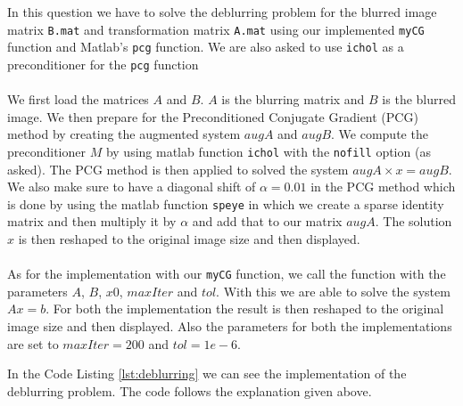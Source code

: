 \documentclass[unicode,11pt,a4paper,oneside,numbers=endperiod,openany]{scrartcl}
\begin{document}
In this question we have to solve the deblurring problem for the blurred image matrix \texttt{B.mat} and transformation matrix \texttt{A.mat} using our implemented \texttt{myCG} function and Matlab's \texttt{pcg} function. We are also asked to use \texttt{ichol} as a preconditioner for the \texttt{pcg} function
\\
\\
We first load the matrices $A$ and $B$. $A$ is the blurring matrix and $B$ is the blurred image. We then prepare for the Preconditioned Conjugate Gradient (PCG) method by creating the augmented system $augA$ and $augB$. We compute the preconditioner $M$ by using matlab function \texttt{ichol} with the \texttt{nofill} option (as asked). The PCG method is then applied to solved the system $augA \times x = augB$. We also make sure to have a diagonal shift of $\alpha = 0.01$ in the PCG method which is done by using the matlab function \texttt{speye} in which we create a sparse identity matrix and then multiply it by $\alpha$ and add that to our matrix $augA$. The solution $x$ is then reshaped to the original image size and then displayed.
\\
\\
As for the implementation with our \texttt{myCG} function, we call the function with the parameters $A$, $B$, $x0$, $maxIter$ and $tol$. With this we are able to solve the system $Ax = b$. For both the implementation the result is then reshaped to the original image size and then displayed. Also the parameters for both the implementations are set to $maxIter = 200$ and $tol = 1e-6$.

In the Code Listing \ref{lst:deblurring} we can see the implementation of the deblurring problem. The code follows the explanation given above.
\end{document}
